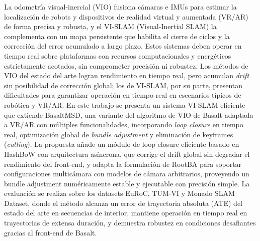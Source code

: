 La odometría visual-inercial (VIO) fusiona cámaras e IMUs para estimar la localización de robots y dispositivos de realidad virtual y aumentada (VR/AR) de forma precisa y robusta, y el VI-SLAM (Visual-Inertial SLAM) la complementa con un mapa persistente que habilita el cierre de ciclos y la corrección del error acumulado a largo plazo.
Estos sistemas deben operar en tiempo real sobre plataformas con recursos computacionales y energéticos estrictamente acotados, sin comprometer precisión ni robustez.
Los métodos de VIO del estado del arte logran rendimiento en tiempo real, pero acumulan \textit{drift} sin posibilidad de corrección global; los de VI-SLAM, por su parte, presentan dificultades para garantizar operación en tiempo real en escenarios típicos de robótica y VR/AR.
En este trabajo se presenta un sistema VI-SLAM eficiente que extiende BasaltMSD, una variante del algoritmo de VIO de Basalt adaptada a VR/AR con múltiples funcionalidades, incorporando \textit{loop closure} en tiempo real, optimización global de \textit{bundle adjustment} y eliminación de keyframes (\textit{culling}). La propuesta añade un módulo de loop closure eficiente basado en HashBoW con arquitectura asíncrona, que corrige el drift global sin degradar el rendimiento del front-end, y adapta la formulación de RootBA para soportar configuraciones multicámara con modelos de cámara arbitrarios, proveyendo un bundle adjustment numéricamente estable y ejecutable con precisión simple.
La evaluación se realiza sobre los datasets EuRoC, TUM-VI y Monado SLAM Dataset, donde el método alcanza un error de trayectoria absoluta (ATE) del estado del arte en secuencias de interior, mantiene operación en tiempo real en trayectorias de extensa duración, y demuestra robustez en condiciones desafiantes gracias al front-end de Basalt.
